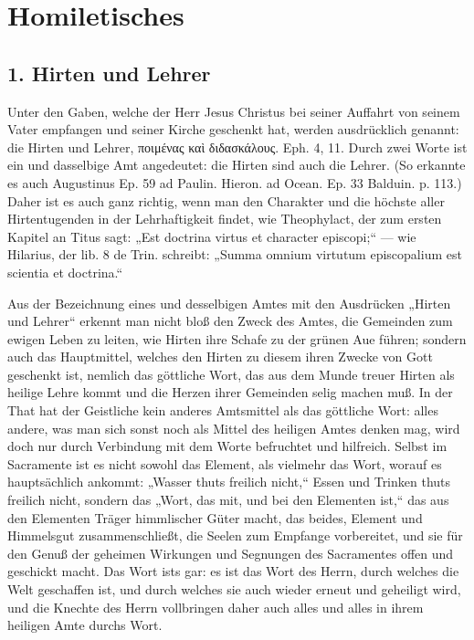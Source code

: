\chapter{Homiletisches}
\section{1. Hirten und Lehrer}

Unter den Gaben, welche der Herr Jesus Christus bei seiner Auffahrt von seinem Vater empfangen und seiner Kirche geschenkt hat, werden ausdrücklich genannt: die Hirten und Lehrer, ποιμένας καὶ διδασκάλους. Eph. 4, 11. Durch zwei Worte ist ein und dasselbige Amt angedeutet: die Hirten sind auch die Lehrer. (So erkannte es auch Augustinus Ep. 59 ad Paulin. Hieron. ad Ocean. Ep. 33 Balduin. p. 113.) Daher ist es auch ganz richtig, wenn man den Charakter und die höchste aller Hirtentugenden in der Lehrhaftigkeit findet, wie Theophylact, der zum ersten Kapitel an Titus sagt: „Est doctrina virtus et character episcopi;“ — wie Hilarius, der lib. 8 de Trin. schreibt: „Summa omnium virtutum episcopalium est scientia et doctrina.“

Aus der Bezeichnung eines und desselbigen Amtes mit den Ausdrücken „Hirten und Lehrer“ erkennt man nicht bloß den Zweck des Amtes, die Gemeinden zum ewigen Leben zu leiten, wie Hirten ihre Schafe zu der grünen Aue führen; sondern auch das Hauptmittel, welches den Hirten zu diesem ihren Zwecke von Gott geschenkt ist, nemlich das göttliche Wort, das aus dem Munde treuer Hirten als heilige Lehre kommt
und die Herzen ihrer Gemeinden selig machen muß. In der That hat der Geistliche kein anderes Amtsmittel als das göttliche Wort: alles andere, was man sich sonst noch als Mittel des heiligen Amtes denken mag, wird doch nur durch Verbindung mit dem Worte befruchtet und hilfreich. Selbst im Sacramente ist es nicht sowohl das Element, als vielmehr das Wort, worauf es hauptsächlich ankommt: „Wasser thuts freilich nicht,“ Essen und Trinken thuts freilich nicht, sondern das „Wort, das mit, und bei den Elementen ist,“ das aus den Elementen Träger himmlischer Güter macht, das beides, Element und Himmelsgut zusammenschließt, die Seelen zum Empfange vorbereitet, und sie für den Genuß der geheimen Wirkungen und Segnungen des Sacramentes offen und geschickt macht. Das Wort ists gar: es ist das Wort des Herrn, durch welches die Welt geschaffen ist, und durch welches sie auch wieder erneut und geheiligt wird, und die Knechte des Herrn vollbringen daher auch alles und alles in ihrem heiligen Amte durchs Wort.

